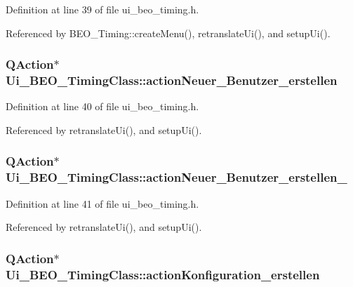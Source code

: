 Definition at line 39 of file ui\_\-beo\_\-timing.h.

Referenced by BEO\_\-Timing::createMenu(), retranslateUi(), and setupUi().\hypertarget{class_ui___b_e_o___timing_class_4e742eca416a99a53d690ac851cf049e}{
\subsubsection[actionNeuer\_\-Benutzer\_\-erstellen]{\setlength{\rightskip}{0pt plus 5cm}QAction$\ast$ {\bf Ui\_\-BEO\_\-TimingClass::actionNeuer\_\-Benutzer\_\-erstellen}}}
\label{class_ui___b_e_o___timing_class_4e742eca416a99a53d690ac851cf049e}




Definition at line 40 of file ui\_\-beo\_\-timing.h.

Referenced by retranslateUi(), and setupUi().\hypertarget{class_ui___b_e_o___timing_class_58256a822fe74b070f31c7c15d59c382}{
\subsubsection[actionNeuer\_\-Benutzer\_\-erstellen\_\-2]{\setlength{\rightskip}{0pt plus 5cm}QAction$\ast$ {\bf Ui\_\-BEO\_\-TimingClass::actionNeuer\_\-Benutzer\_\-erstellen\_}}}
\label{class_ui___b_e_o___timing_class_58256a822fe74b070f31c7c15d59c382}




Definition at line 41 of file ui\_\-beo\_\-timing.h.

Referenced by retranslateUi(), and setupUi().\hypertarget{class_ui___b_e_o___timing_class_39d8c06d28695c5372839d9b8017f153}{
\subsubsection[actionKonfiguration\_\-erstellen]{\setlength{\rightskip}{0pt plus 5cm}QAction$\ast$ {\bf Ui\_\-BEO\_\-TimingClass::actionKonfiguration\_\-erstellen}}}
\label{class_ui___b_e_o___timing_class_39d8c06d28695c5372839d9b8017f153}




